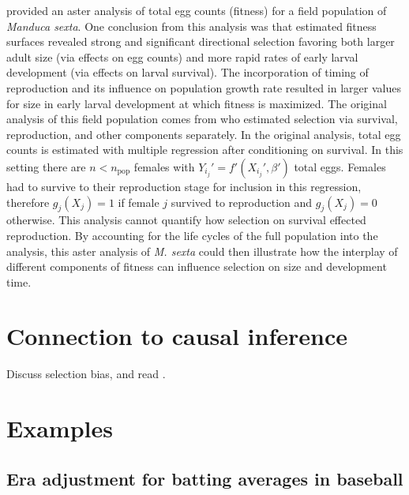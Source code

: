 \documentclass[11pt]{article}
\newcommand{\npop}{n_{\text{pop}}}
\newcommand{\nsys}{n}
\begin{document}
\cite{eck2015integrated} provided an aster analysis of total egg counts (fitness) for a field population of \emph{Manduca sexta}. One conclusion from this analysis was that estimated fitness surfaces revealed strong and significant directional selection favoring both larger adult size (via effects on egg counts) and more rapid rates of early larval development (via effects on larval survival). The incorporation of timing of reproduction and its influence on population growth rate  resulted in larger values for size in early larval development at which fitness is maximized. The original analysis of this field population comes from \cite{kingsolver2012direct} who estimated selection via survival, reproduction, and other components separately. %
In the original analysis, total egg counts is estimated with multiple regression after conditioning on survival. In this setting there are $\nsys < \npop$ females with $Y_{i_j}' = f'(X_{i_j}', \beta')$ total eggs. Females had to survive to their reproduction stage for inclusion in this regression, therefore $g_j(X_j) = 1$ if female $j$ survived to reproduction and $g_j(X_j) = 0$ otherwise. This analysis cannot quantify how selection on survival effected reproduction. By accounting for the life cycles of the full population into the analysis, this aster analysis of \emph{M. sexta} could then illustrate how the interplay of different components of fitness can influence selection on size and development time.


\section{Connection to causal inference}

Discuss selection bias, and read \cite{imbens2018causal}.


\section{Examples}


\subsection{Era adjustment for batting averages in baseball}
\end{document}
